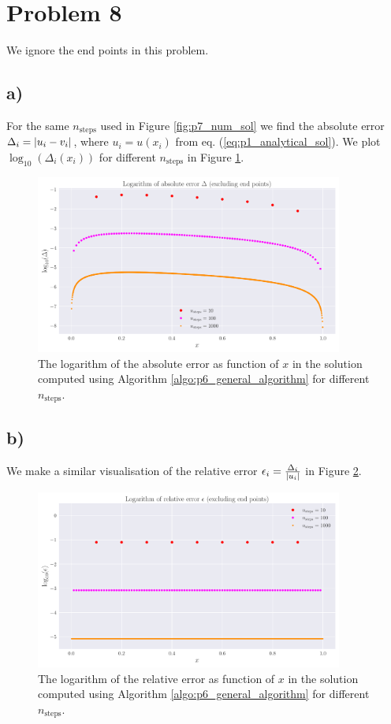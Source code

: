 \documentclass[english,notitlepage,nofootinbib]{revtex4-1}  %
\newcommand{\Fig}[1]{Figure \ref{fig:#1}}
\newcommand{\Eq}[1]{eq. (\ref{eq:#1})}
\newcommand{\Algo}[1]{Algorithm \ref{algo:#1}}
\begin{document}
\section*{Problem 8}

We ignore the end points in this problem.

\subsection*{a)}

For the same $n_\text{steps}$ used in \Fig{p7_num_sol} we find the absolute error $\Delta_i = \abs{u_i-v_i}$, where $u_i=u(x_i)$ from \Eq{p1_analytical_sol}. We plot $\log_{10}(\Delta_i(x_i))$ for different $n_\text{steps}$ in \Fig{p8_abs_err}. 


\begin{figure}[h!]
    \centering
    \includegraphics[width=0.9\textwidth]{absolute_error.pdf}
    \caption{The logarithm of the absolute error as function of $x$ in the solution computed using \Algo{p6_general_algorithm} for different $n_\text{steps}$.}\label{fig:p8_abs_err}
\end{figure}

\subsection*{b)}

We make a similar visualisation of the relative error $\epsilon_i= \frac{\Delta_i}{\abs{u_i}}$ in \Fig{p8_rel_err}.

\begin{figure}[h!]
    \centering
    \includegraphics[width=0.9\textwidth]{relative_error.pdf}
    \caption{The logarithm of the relative error as function of $x$ in the solution computed using \Algo{p6_general_algorithm} for different $n_\text{steps}$.}\label{fig:p8_rel_err}
\end{figure}
\end{document}
